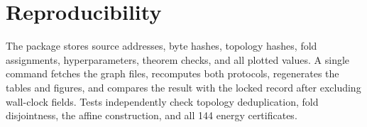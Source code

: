 \documentclass[10pt,letterpaper,twoside]{article}
\begin{document}
\section{Reproducibility}

The package stores source addresses, byte hashes, topology hashes, fold
assignments, hyperparameters, theorem checks, and all plotted values.  A single
command fetches the graph files, recomputes both protocols, regenerates the
tables and figures, and compares the result with the locked record after
excluding wall-clock fields.  Tests independently check topology
deduplication, fold disjointness, the affine construction, and all 144 energy
certificates.



\end{document}
